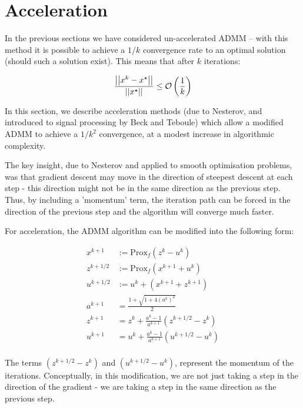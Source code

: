 \section{Acceleration}\label{sec:accel}

In the previous sections we have considered un-accelerated ADMM – with this method it is possible to achieve a \(1/k\) convergence rate to an optimal solution (should such a solution exist). This means that after \(k\) iterations:

\begin{equation}
\frac{\left|\left|x^k - x^{\star}\right|\right|}{\left|\left|x^{\star}\right|\right|} \leq \mathcal{O}\left(\frac{1}{k}\right)
\end{equation}

In this section, we describe acceleration methods (due to Nesterov, and introduced to signal processing by Beck and Teboule) which allow a modified ADMM to achieve a \(1/k^2\) convergence, at a modest increase in algorithmic complexity.

The key insight, due to Nesterov and applied to smooth optimisation problems, was that gradient descent may move in the direction of steepest descent at each step - this direction might not be in the same direction as the previous step. Thus, by including a 'momentum' term, the iteration path can be forced in the direction of the previous step and the algorithm will converge much faster.

For acceleration, the ADMM algorithm can be modified into the following form:

\begin{align}
x^{k+1} &:= \mathrm{Prox}_f \left( z^k - u^k\right)\\
z^{k+1/2} &:= \mathrm{Prox}_f \left(x^{k+1} + u^k\right)  \\
u^{k+1/2} &:= u^{k} + \left(x^{k+1} + z^{k+1}\right) \\
a^{k+1} &= \frac{1+\sqrt{1+4(a^k)^2}}{2} \\
z^{k+1} &= z^k + \frac{a^{k}-1}{a^{k+1}}\left(z^{k+1/2} - z^{k}\right) \\
u^{k+1} &= u^k + \frac{a^{k}-1}{a^{k+1}}\left(u^{k+1/2} - u^{k}\right) \\	
\end{align}

The terms \( \left(z^{k+1/2} - z^{k}\right) \) and \(\left(u^{k+1/2} - u^{k}\right) \), represent the momentum of the iterations. Conceptually, in this modification, we are not just taking a step in the direction of the gradient - we are taking a step in the same direction as the previous step.

